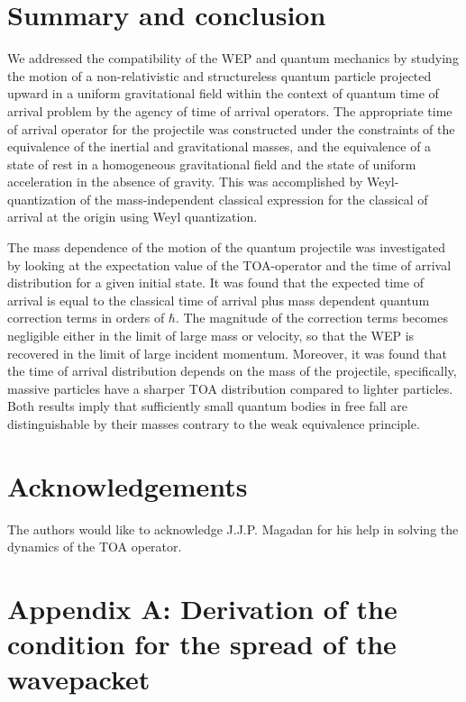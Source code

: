 \documentclass[%
 reprint,
 amsmath,amssymb,
 aps,
]{revtex4-1}
\begin{document}
\section{Summary and conclusion}
\label{sec:conc}

We addressed the compatibility of the WEP and quantum mechanics by studying the motion of a non-relativistic and structureless quantum particle projected upward in a uniform gravitational field within the context of quantum time of arrival problem by the agency of time of arrival operators. The appropriate time of arrival operator for the projectile was constructed under the constraints of the equivalence of the inertial and gravitational masses, and the  equivalence  of  a  state  of  rest  in  a  homogeneous  gravitational  field  and  the  state  of  uniform acceleration in the absence of gravity. This was accomplished by Weyl-quantization of the mass-independent classical expression for the classical of arrival at the origin using Weyl quantization. 

The mass dependence of the motion of the quantum projectile was investigated by looking at the expectation value of the TOA-operator and the time of arrival distribution for a given initial state. It was found that the expected time of arrival is equal to the classical time of arrival plus mass dependent quantum correction terms in orders of $\hbar$. The magnitude of the correction terms becomes negligible either in the limit of large mass or velocity, so that the WEP is recovered in the limit of 
large incident momentum. Moreover, it was found that the time of arrival distribution depends on the mass of the projectile, specifically, 
massive particles have a sharper TOA distribution compared to lighter particles. Both results imply that sufficiently small quantum bodies in free fall are distinguishable by their masses contrary to the weak equivalence principle. 


\section*{Acknowledgements}
The authors would like to acknowledge J.J.P. Magadan for his help in solving the dynamics of the TOA operator. 


\section*{Appendix A: Derivation of the condition for the spread of the wavepacket}
\label{sec:sigma_cond}
\end{document}
